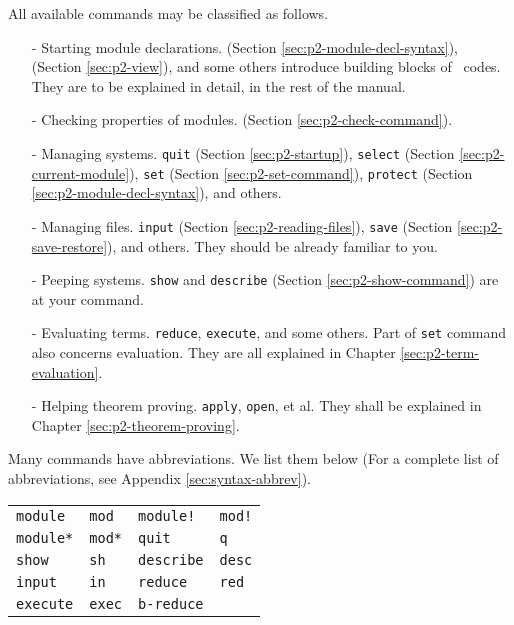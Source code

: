 \documentclass[a4paper]{memoir}
\begin{document}
All available commands may be classified as follows.
\begin{itemize}
\item[-] Starting module declarations. 
 (Section \ref{sec:p2-module-decl-syntax}), 
 (Section \ref{sec:p2-view}), and some others introduce building
 blocks of \cafeobj~codes. They are to be explained in detail, in the rest of
 the manual.
\item[-] Checking properties of modules. 
 (Section \ref{sec:p2-check-command}).
\item[-] Managing systems. \verb|quit| (Section \ref{sec:p2-startup}),
 \verb|select| (Section \ref{sec:p2-current-module}),
 \verb|set| (Section \ref{sec:p2-set-command}),
 \verb|protect| (Section \ref{sec:p2-module-decl-syntax}), and others.
\item[-] Managing files. \verb|input| (Section \ref{sec:p2-reading-files}),
 \verb|save| (Section \ref{sec:p2-save-restore}), and others. They
  should be already familiar to you.
\item[-] Peeping systems. \verb|show| and \verb|describe|
 (Section \ref{sec:p2-show-command}) are at your command.
\item[-] Evaluating terms. \verb|reduce|,
 \verb|execute|, and some others. Part of
 \verb|set| command also concerns evaluation. They are all explained in
  Chapter \ref{sec:p2-term-evaluation}.
\item[-] Helping theorem proving. \verb|apply|, \verb|open|, et al. They
 shall be explained in Chapter \ref{sec:p2-theorem-proving}.
\end{itemize}

Many commands have abbreviations. We list them below (For a complete 
list of abbreviations, see Appendix \ref{sec:syntax-abbrev}).
\begin{center}
\begin{tabular}{ll||ll}
\verb|module| & \verb|mod| & \verb|module!| & \verb|mod!| \\
\verb|module*| & \verb|mod*| & \verb|quit| & \verb|q| \\
\verb|show| & \verb|sh| & \verb|describe| & \verb|desc| \\
\verb|input| & \verb|in| & \verb|reduce| & \verb|red| \\
\verb|execute| & \verb|exec| & \verb|b-reduce| & \verb\bred| \\
\end{tabular}
\end{center}
\end{document}
